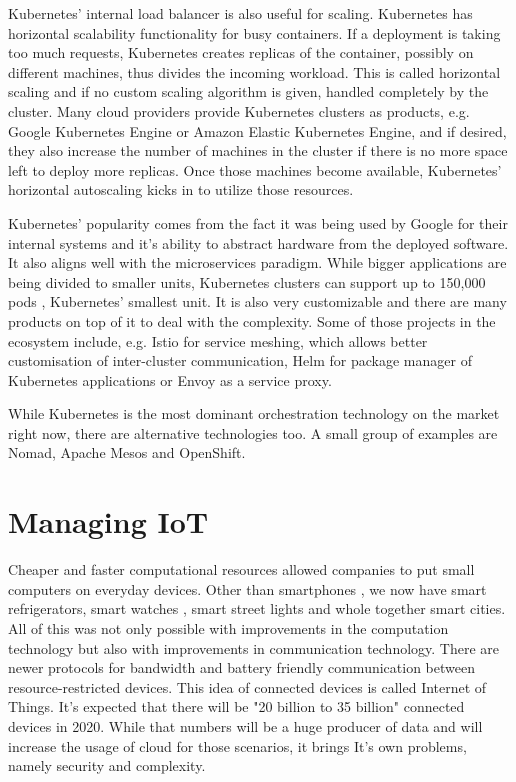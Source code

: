Kubernetes' internal load balancer is also useful for scaling. Kubernetes has horizontal scalability functionality for busy containers. If a deployment is taking too much requests, Kubernetes creates replicas of the container, possibly on different machines, thus divides the incoming workload. This is called horizontal scaling and if no custom scaling algorithm is given, handled completely by the cluster. Many cloud providers provide Kubernetes clusters as products, e.g. Google Kubernetes Engine or Amazon Elastic Kubernetes Engine, and if desired, they also increase the number of machines in the cluster if there is no more space left to deploy more replicas. Once those machines become available, Kubernetes' horizontal autoscaling kicks in to utilize those resources.

Kubernetes' popularity comes from the fact it was being used by Google for their internal systems and it's ability to abstract hardware from the deployed software. It also aligns well with the microservices paradigm. While bigger applications are being divided to smaller units, Kubernetes clusters can support up to 150,000 pods \cite{kubernetes-load}, Kubernetes' smallest unit. It is also very customizable and there are many products on top of it to deal with the complexity. Some of those projects in the ecosystem include, e.g. Istio for service meshing, which allows better customisation of inter-cluster communication, Helm for package manager of Kubernetes applications or Envoy as a service proxy.

While Kubernetes is the most dominant orchestration technology on the market right now, there are alternative technologies too. A small group of examples are Nomad, Apache Mesos and OpenShift.

\newpage
\section{Managing IoT}
Cheaper and faster computational resources allowed companies to put small computers on everyday devices. Other than smartphones , we now have smart refrigerators, smart watches , smart street lights and whole together smart cities. All of this was not only possible with improvements in the computation technology but also with improvements in communication technology. There are newer protocols for bandwidth and battery friendly communication between resource-restricted devices. This idea of connected devices is called Internet of Things. It's expected that there will be "20 billion to 35 billion"\cite{unikernels-improve} connected devices in 2020. While that numbers will be a huge producer of data and will increase the usage of cloud for those scenarios, it brings It's own problems, namely security and complexity.

